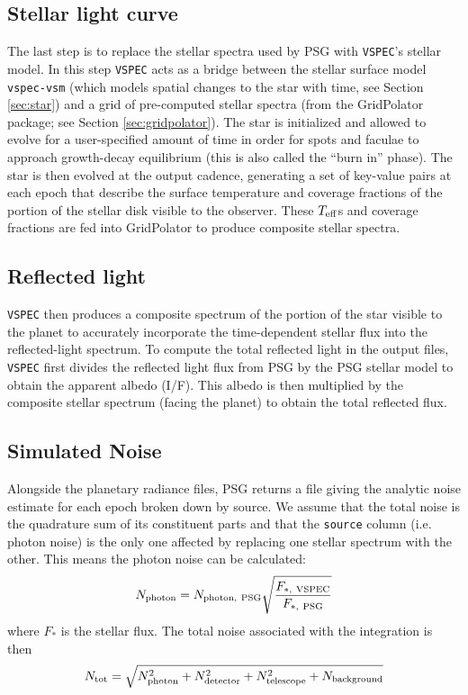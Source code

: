 \documentclass[linenumbers,preprint,authoryear]{elsarticle}
\newcommand{\teff}{$T_{\rm eff}$}
\newcommand{\vspec}[1]{\texttt{VSPEC}#1}
\begin{document}
\subsection{Stellar light curve}

The last step is to replace the stellar spectra used by PSG with \vspec{}'s stellar model. In this step \vspec{} acts as a bridge between
the stellar surface model \texttt{vspec-vsm} (which models spatial changes to the star with time, see Section \ref{sec:star}) and a grid of
pre-computed stellar spectra (from the GridPolator package; see Section \ref{sec:gridpolator}). The star is initialized and allowed to evolve for a user-specified amount of time in order for spots and faculae to approach growth-decay equilibrium (this is also called the ``burn in'' phase). The star is then evolved at the output cadence, generating a set of key-value pairs at each epoch that describe the surface temperature and coverage fractions of the portion of the stellar disk visible to the observer. These \teff s and coverage fractions are fed into GridPolator to produce composite stellar spectra.

\subsection{Reflected light}
\vspec{} then produces a composite spectrum of the portion of the star visible to the planet to accurately incorporate the time-dependent stellar flux into the reflected-light spectrum. To compute the total reflected light in the output files, \vspec{} first divides the reflected light flux from PSG by the PSG stellar model to obtain the apparent albedo (I/F). This albedo is then multiplied by the composite stellar spectrum (facing the planet) to obtain the total reflected flux.

\subsection{Simulated Noise}
Alongside the planetary radiance files, PSG returns a file giving the analytic noise estimate for each epoch broken down by source. We assume that the total noise is the quadrature sum of its constituent parts and that the \texttt{source} column (i.e. photon noise) is the only one affected by replacing one stellar spectrum with the other. This means the photon noise can be calculated:
\begin{equation}
    N_{\rm photon} = N_{\rm photon,~PSG} \sqrt{\frac{F_{*,\rm ~VSPEC}}{F_{*,\rm ~PSG}}}
\end{equation}
where $F_*$ is the stellar flux. The total noise associated with the integration is then
\begin{equation}
    N_{\rm tot} = \sqrt{
        N_{\rm photon}^2 + N_{\rm detector}^2 + N_{\rm telescope}^2 + N_{\rm background}
    }
\end{equation}
\end{document}
